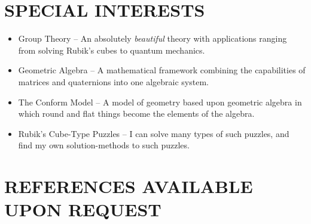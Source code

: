\documentclass[margin]{res}
\begin{document}
\begin{resume}
\section{SPECIAL INTERESTS}
		\begin{itemize}\itemsep -2pt %
		\item Group Theory -- An absolutely {\it beautiful} theory with applications ranging from solving Rubik's cubes to quantum mechanics.
		\item Geometric Algebra -- A mathematical framework combining the capabilities of matrices and quaternions into one algebraic system.
		\item The Conform Model -- A model of geometry based upon geometric algebra in which round and flat things become the elements of the algebra.
		\item Rubik's Cube-Type Puzzles -- I can solve many types of such puzzles, and find my own solution-methods to such puzzles.
		\end{itemize}

\section{REFERENCES AVAILABLE UPON REQUEST}

\end{resume}
\end{document}
